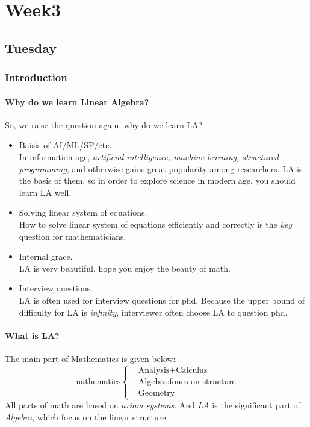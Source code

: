 
\chapter{Week3}

\section{Tuesday}
\subsection{Introduction}
\subsubsection{Why do we learn Linear Algebra?}
So, we raise the question again, why do we learn LA?
\begin{itemize}
\item
Baisis of AI/ML/SP/etc.\\
In information age, \textit{artificial intelligence, machine learning, structured programming}, and otherwise gains great popularity among researchers. LA is the basis of them, so in order to explore science in modern age, you should learn LA well.
\item
Solving linear system of equations.\\
How to solve linear system of equations efficiently and correctly is the \emph{key} question for mathematicians.
\item
Internal grace.\\
LA is very beautiful, hope you enjoy the beauty of math.
\item
Interview questions.\\
LA is often used for interview questions for phd. Because the upper bound of difficulty for LA is \emph{infinity}, interviewer often choose LA to question phd.
\end{itemize}
\subsubsection{What is LA?}
The main part of Mathematics is given below:
\[
\text{mathematics}\begin{cases}
&\text{Analysis+Calculus} \\
&\text{Algebra:foucs on structure} \\
&\text{Geometry}
\end{cases}
\]
All parts of math are based on \emph{axiom systems}. And \emph{LA} is the significant part of \textit{Algebra}, which focus on the linear structure.

